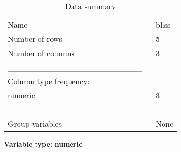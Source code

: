 \documentclass[
]{article}
\begin{document}
\begin{longtable}[]{@{}ll@{}}
\caption{Data summary}\tabularnewline
\toprule\noalign{}
\endfirsthead
\endhead
\bottomrule\noalign{}
\endlastfoot
Name & bliss \\
Number of rows & 5 \\
Number of columns & 3 \\
\_\_\_\_\_\_\_\_\_\_\_\_\_\_\_\_\_\_\_\_\_\_\_ & \\
Column type frequency: & \\
numeric & 3 \\
\_\_\_\_\_\_\_\_\_\_\_\_\_\_\_\_\_\_\_\_\_\_\_\_ & \\
Group variables & None \\
\end{longtable}

\textbf{Variable type: numeric}
\end{document}

